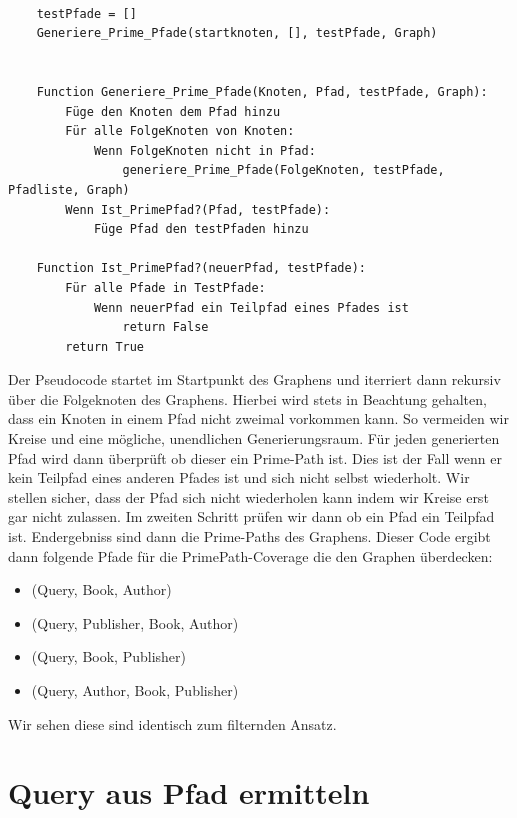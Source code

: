 \begin{verbatim}

    testPfade = []
    Generiere_Prime_Pfade(startknoten, [], testPfade, Graph)


    Function Generiere_Prime_Pfade(Knoten, Pfad, testPfade, Graph):
        Füge den Knoten dem Pfad hinzu
        Für alle FolgeKnoten von Knoten:
            Wenn FolgeKnoten nicht in Pfad:
                generiere_Prime_Pfade(FolgeKnoten, testPfade, Pfadliste, Graph)
        Wenn Ist_PrimePfad?(Pfad, testPfade):
            Füge Pfad den testPfaden hinzu

    Function Ist_PrimePfad?(neuerPfad, testPfade):
        Für alle Pfade in TestPfade:
            Wenn neuerPfad ein Teilpfad eines Pfades ist
                return False
        return True

\end{verbatim}

Der Pseudocode startet im Startpunkt des Graphens und iterriert dann rekursiv über die Folgeknoten des Graphens.
Hierbei wird stets in Beachtung gehalten, dass ein Knoten in einem Pfad nicht zweimal vorkommen kann.
So vermeiden wir Kreise und eine mögliche, unendlichen Generierungsraum.
Für jeden generierten Pfad wird dann überprüft ob dieser ein Prime-Path ist.
Dies ist der Fall wenn er kein Teilpfad eines anderen Pfades ist und sich nicht selbst wiederholt.
Wir stellen sicher, dass der Pfad sich nicht wiederholen kann indem wir Kreise erst gar nicht zulassen.
Im zweiten Schritt prüfen wir dann ob ein Pfad ein Teilpfad ist.
Endergebniss sind dann die Prime-Paths des Graphens.
Dieser Code ergibt dann folgende Pfade für die PrimePath-Coverage die den Graphen überdecken:

\begin{itemize}
    \item (Query, Book, Author)
    \item (Query, Publisher, Book, Author)
    \item (Query, Book, Publisher)
    \item (Query, Author, Book, Publisher)
\end{itemize}

Wir sehen diese sind identisch zum filternden Ansatz.

\section{Query aus Pfad ermitteln}

